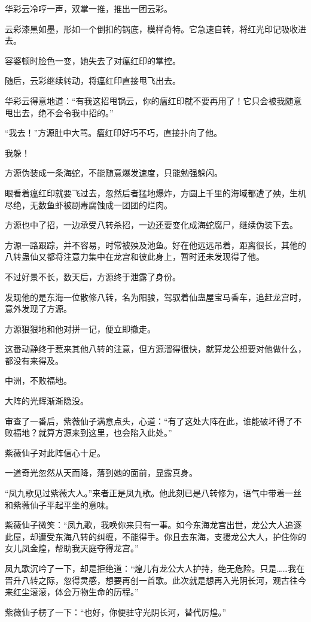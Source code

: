 \begin{this_body}
华彩云冷哼一声，双掌一推，推出一团云彩。

云彩漆黑如墨，形如一个倒扣的锅底，模样奇特。它急速自转，将红光印记吸收进去。

容婆顿时脸色一变，她失去了对瘟红印的掌控。

随后，云彩继续转动，将瘟红印直接甩飞出去。

华彩云得意地道：“有我这招甩锅云，你的瘟红印就不要再用了！它只会被我随意甩出去，绝不会令我中招的。”

“我去！”方源肚中大骂。瘟红印好巧不巧，直接扑向了他。

我躲！

方源伪装成一条海蛇，不能随意爆发速度，只能勉强躲闪。

眼看着瘟红印就要飞过去，忽然后者猛地爆炸，方圆上千里的海域都遭了殃，生机尽绝，无数鱼虾被剧毒腐蚀成一团团的烂肉。

方源也中了招，一边承受八转杀招，一边还要变化成海蛇腐尸，继续伪装下去。

方源一路跟踪，并不容易，时常被殃及池鱼。好在他远远吊着，距离很长，其他的八转蛊仙又都将注意力集中在龙宫和彼此身上，暂时还未发现得了他。

不过好景不长，数天后，方源终于泄露了身份。

发现他的是东海一位散修八转，名为阳骏，驾驭着仙蛊屋宝马香车，追赶龙宫时，意外发现了方源。

方源狠狠地和他对拼一记，便立即撤走。

这番动静终于惹来其他八转的注意，但方源溜得很快，就算龙公想要对他做什么，都没有来得及。

中洲，不败福地。

大阵的光辉渐渐隐没。

审查了一番后，紫薇仙子满意点头，心道：“有了这处大阵在此，谁能破坏得了不败福地？就算方源来到这里，也会陷入此处。”

紫薇仙子对此阵信心十足。

一道奇光忽然从天而降，落到她的面前，显露真身。

“凤九歌见过紫薇大人。”来者正是凤九歌。他此刻已是八转修为，语气中带着一丝和紫薇仙子平起平坐的意味。

紫薇仙子微笑：“凤九歌，我唤你来只有一事。如今东海龙宫出世，龙公大人追逐此屋，却遭受东海八转的纠缠，不能得手。你且去东海，支援龙公大人，护住你的女儿凤金煌，帮助我天庭夺得龙宫。”

凤九歌沉吟了一下，却是拒绝道：“煌儿有龙公大人护持，绝无危险。只是……我在晋升八转之际，忽得灵感，想要再创一首歌。此次就是想再入光阴长河，观古往今来红尘滚滚，体会万物生命的历程。”

紫薇仙子楞了一下：“也好，你便驻守光阴长河，替代厉煌。”

\end{this_body}

